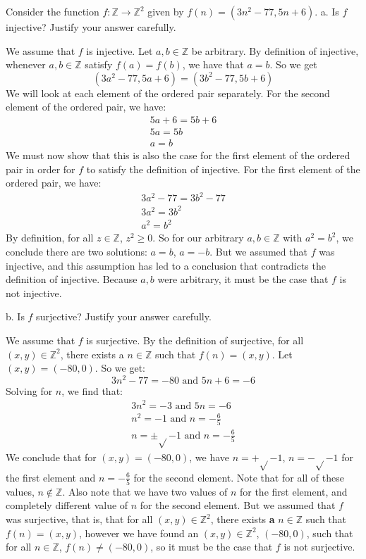 \documentclass[12pt]{article}
\newenvironment{problem}[2][Problem]
{
	\begin{trivlist} 
		\item[\hskip \labelsep {\bfseries #1 #2:}]
	}
{
	\end{trivlist}
	}
\newenvironment{solution}[1][Solution]
{
	\begin{trivlist} 
		\item[\hskip \labelsep {\itshape #1:}]
	}
	{
	\end{trivlist}
}
\begin{document}
\begin{problem}{1}
	Consider the function $f : \mathbb{Z} \to \mathbb{Z}^2$ given by $f(n) = (3n^2 -77, 5n + 6)$.
	\newline
	\newline
	\noindent a. Is $f$ injective? Justify your answer carefully.
\begin{solution}
	We assume that $f$ is injective. Let $a,b \in \mathbb{Z}$ be arbitrary. By definition of injective, whenever $a, b \in \mathbb{Z}$ satisfy $f(a)=f(b)$, we have that $a=b$. So we get
	\[
	(3a^2-77,5a+6) = (3b^2-77,5b+6)
	\]
	We will look at each element of the ordered pair separately. For the second element of the ordered pair, we have:
	\begin{align*}
	5a+6=5b+6\\
	5a=5b\\
	a=b
	\end{align*}
	We must now show that this is also the case for the first element of the ordered pair in order for $f$ to satisfy the definition of injective.
	For the first element of the ordered pair, we have:
	\begin{align*}
	3a^2-77=3b^2-77\\
	3a^2=3b^2\\
	a^2=b^2
	\end{align*}
	By definition, for all $z \in \mathbb{Z}$, $z^2 \geq 0$. So for our arbitrary $a,b \in \mathbb{Z}$ with $a^2 = b^2$, we conclude there are two solutions: $a=b$, $a=-b$. But we assumed that $f$ was injective, and this assumption has led to a conclusion that contradicts the definition of injective. Because $a,b$ were arbitrary, it must be the case that $f$ is not injective.
	 \end{solution}

\noindent b. Is $f$ surjective? Justify your answer carefully.
\begin{solution}
	We assume that $f$ is surjective. By the definition of surjective, for all $(x,y) \in \mathbb{Z}^2$, there exists a $n \in \mathbb{Z}$ such that $f(n)=(x,y)$. Let $(x,y)=(-80, 0)$. So we get:
	\[
	3n^2-77= -80 \text{ and } 5n+6=-6
	\]
	Solving for $n$, we find that:
	\begin{align*}
	3n^2=-3 \text{      and     } 5n=-6\\
	n^2=-1 \text{      and      } n=-\frac{6}{5}\\
	n=\pm \sqrt{}{-1} \text{      and      } n=-\frac{6}{5}
	\end{align*}
	We conclude that for $(x,y)=(-80,0)$, we have $n=+\sqrt{}{-1}$, $n=-\sqrt{}{-1}$ for the first element and $n=-\frac{6}{5}$ for the second element. Note that for all of these values, $n \notin \mathbb{Z}$. Also note that we have two values of $n$ for the first element, and completely different value of $n$ for the second element. But we assumed that $f$ was surjective, that is, that for all $(x,y) \in \mathbb{Z}^2$, there exists {\bf a} $n \in \mathbb{Z}$ such that $f(n)=(x,y)$, however we have found an $(x,y) \in \mathbb{Z}^2$, $(-80,0)$, such that for all $n \in \mathbb{Z}$, $f(n) \neq (-80,0)$, so it must be the case that $f$ is not surjective.	
	

\end{solution}
\end{problem}
\end{document}
